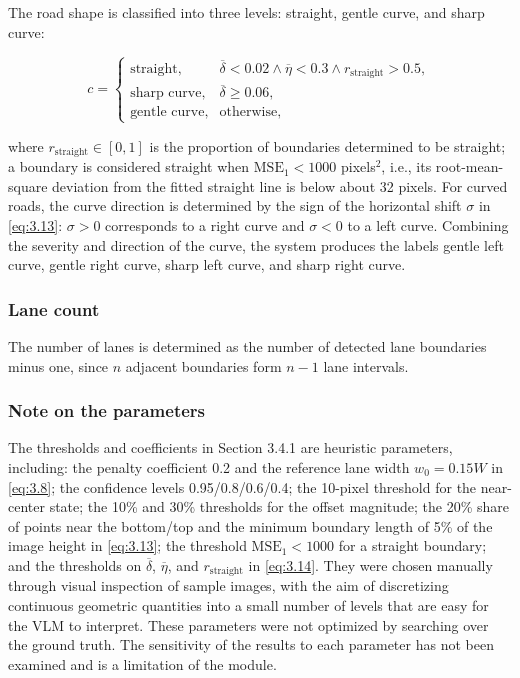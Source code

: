 \documentclass[12pt,a4paper]{report}
\begin{document}
The road shape is classified into three levels: straight, gentle curve, and sharp curve:

\begin{equation}
c=
\begin{cases}
\text{straight},
&
\overline{\delta}<0.02
\land
\overline{\eta}<0.3
\land
r_{\mathrm{straight}}>0.5,
\\[4pt]
\text{sharp curve},
&
\overline{\delta}\geq0.06,
\\[4pt]
\text{gentle curve},
&
\text{otherwise},
\end{cases}
\label{eq:3.14}
\end{equation}

where $r_{\mathrm{straight}}\in[0,1]$ is the proportion of boundaries determined to be straight; a boundary is considered straight when $\mathrm{MSE}_1<1000$ pixels$^2$, i.e., its root-mean-square deviation from the fitted straight line is below about 32 pixels. For curved roads, the curve direction is determined by the sign of the horizontal shift $\sigma$ in \eqref{eq:3.13}: $\sigma>0$ corresponds to a right curve and $\sigma<0$ to a left curve. Combining the severity and direction of the curve, the system produces the labels gentle left curve, gentle right curve, sharp left curve, and sharp right curve.

\subsubsection*{Lane count}

The number of lanes is determined as the number of detected lane boundaries minus one, since $n$ adjacent boundaries form $n-1$ lane intervals.

\subsubsection*{Note on the parameters}

The thresholds and coefficients in Section 3.4.1 are heuristic parameters, including: the penalty coefficient 0.2 and the reference lane width $w_0=0.15W$ in \eqref{eq:3.8}; the confidence levels 0.95/0.8/0.6/0.4; the 10-pixel threshold for the near-center state; the 10\% and 30\% thresholds for the offset magnitude; the 20\% share of points near the bottom/top and the minimum boundary length of 5\% of the image height in \eqref{eq:3.13}; the threshold $\mathrm{MSE}_1<1000$ for a straight boundary; and the thresholds on $\overline{\delta}$, $\overline{\eta}$, and $r_{\mathrm{straight}}$ in \eqref{eq:3.14}. They were chosen manually through visual inspection of sample images, with the aim of discretizing continuous geometric quantities into a small number of levels that are easy for the VLM to interpret. These parameters were not optimized by searching over the ground truth. The sensitivity of the results to each parameter has not been examined and is a limitation of the module.
\end{document}
